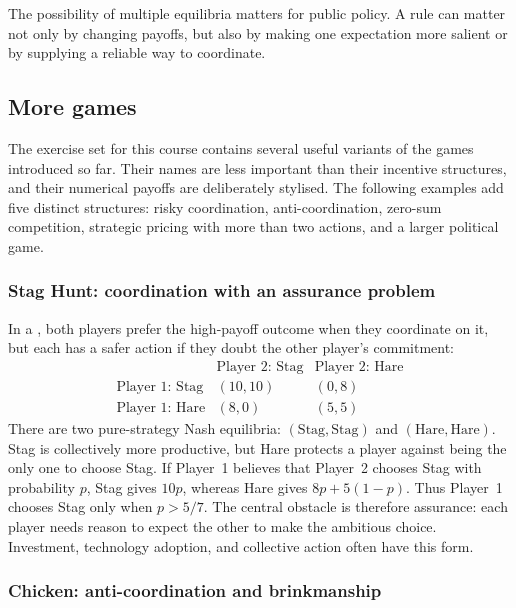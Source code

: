 The possibility of multiple equilibria matters for public policy. A rule can
matter not only by changing payoffs, but also by making one expectation more
salient or by supplying a reliable way to coordinate.

\subsection{More games}
\label{sec:more-games}

The exercise set for this course contains several useful variants of the
games introduced so far. Their names are less important than their incentive
structures, and their numerical payoffs are deliberately stylised. The
following examples add five distinct structures: risky coordination,
anti-coordination, zero-sum competition, strategic pricing with more than two
actions, and a larger political game.

\subsubsection{Stag Hunt: coordination with an assurance problem}

In a , both players prefer the high-payoff outcome when
they coordinate on it, but each has a safer action if they doubt the other
player's commitment:
\[
\begin{array}{c|cc}
 & \text{Player 2: Stag} & \text{Player 2: Hare}\\
\hline
\text{Player 1: Stag} & (10,10) & (0,8)\\
\text{Player 1: Hare} & (8,0) & (5,5)
\end{array}
\]
There are two pure-strategy Nash equilibria: \((\text{Stag},\text{Stag})\)
and \((\text{Hare},\text{Hare})\). Stag is collectively more productive, but
Hare protects a player against being the only one to choose Stag. If Player~1
believes that Player~2 chooses Stag with probability \(p\), Stag gives
\(10p\), whereas Hare gives \(8p+5(1-p)\). Thus Player~1 chooses Stag only
when \(p>5/7\). The central obstacle is therefore assurance: each player needs
reason to expect the other to make the ambitious choice. Investment,
technology adoption, and collective action often have this form.

\subsubsection{Chicken: anti-coordination and brinkmanship}


